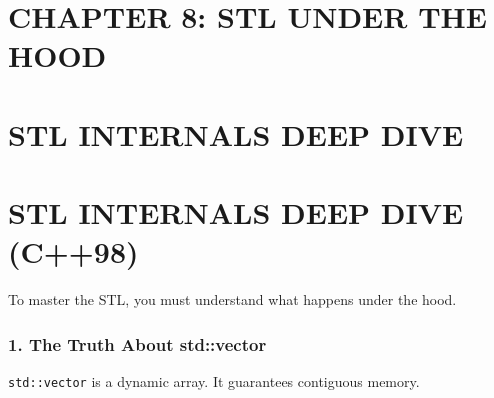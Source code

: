 \hypertarget{chapter-8-stl-under-the-hood}{%
\section{CHAPTER 8: STL UNDER THE
HOOD}\label{chapter-8-stl-under-the-hood}}

\hypertarget{stl-internals-deep-dive}{%
\section{STL INTERNALS DEEP DIVE}\label{stl-internals-deep-dive}}

\hypertarget{stl-internals-deep-dive-c98}{%
\section{STL INTERNALS DEEP DIVE
(C++98)}\label{stl-internals-deep-dive-c98}}

To master the STL, you must understand what happens under the hood.

\hypertarget{the-truth-about-stdvector}{%
\subsubsection{1. The Truth About
std::vector}\label{the-truth-about-stdvector}}

\passthrough{\lstinline!std::vector!} is a dynamic array. It guarantees
contiguous memory.


